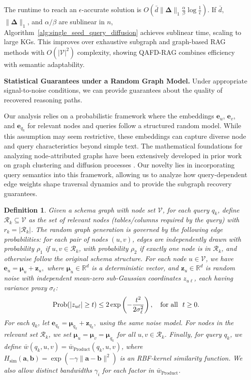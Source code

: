 \documentclass{article} %
\newtheorem{definition}[theorem]{Definition}
\begin{document}
The runtime to reach an $\epsilon$-accurate solution is $O(\bar{d}\|\boldsymbol{\Delta}\|_1 \tfrac{\alpha}{\beta} \log \tfrac{1}{\epsilon})$. If $\bar{d}$, $\|\boldsymbol{\Delta}\|_1$, and $\alpha/\beta$ are sublinear in $n$, Algorithm~\ref{alg:single_seed_query_diffusion} achieves sublinear time, scaling to large KGs. This improves over exhaustive subgraph and graph-based RAG methods with $O(|\mathcal{V}|^2)$ complexity, showing QAFD-RAG combines efficiency with semantic adaptability.

\noindent \textbf{Statistical Guarantees under a Random Graph Model.} Under appropriate signal-to-noise conditions, we can provide guarantees about the quality of recovered reasoning paths.
%


Our analysis relies on a probabilistic framework where the embeddings $\mathbf{e}_u$, $\mathbf{e}_v$, and $\mathbf{e}_{q_{k}}$ for relevant nodes and queries follow a structured random model. While this assumption may seem restrictive, these embeddings can capture diverse node and query characteristics beyond simple text. The mathematical foundations for analyzing node-attributed graphs have been extensively developed in prior work on graph clustering \citep{AP09,ALM13,AGPT2016,PKDJ17,WFHM2017,FWY20,LG20} and diffusion processes \citep{fountoulakis2020p,yang2023weighted,fountoulakis2021local}. Our novelty lies in incorporating query semantics into this framework, allowing us to analyze how query-dependent edge weights shape traversal dynamics and to provide the subgraph recovery guarantees.
%
\begin{definition}
\label{def:correct-model}
    Given a schema graph with node set $\mathcal{V}$, for each query $q_k$, define $\mathcal{R}_k \subseteq \mathcal{V}$ as the set of relevant nodes (tables/columns required by the query) with $r_k=|\mathcal{R}_k|$. The random graph generation is governed by the following edge probabilities: for each pair of nodes $(u,v)$, edges are independently drawn with probability $\rho_1$ if $u,v \in \mathcal{R}_k$, with probability $\rho_2$ if exactly one node is in $\mathcal{R}_k$, and otherwise follow the original schema structure. For each node $u \in \mathcal{V}$, we have
$
\mathbf{e}_u = \boldsymbol{\mu}_u + \mathbf{z}_u,
$
where $\boldsymbol{\mu}_u \in \mathbb{R}^d$ is a deterministic vector, and $\mathbf{z}_u \in \mathbb{R}^d$ is random noise with independent mean-zero sub-Gaussian coordinates $z_{u\ell}$, each having variance proxy $\sigma_\ell$:
$$
\textnormal{Prob}(|z_{u\ell}| \geq t) \leq 2\exp\left(-\frac{t^2}{2\sigma_\ell^2}\right),   \quad \textnormal{for all}~~t \geq 0.
$$
For each $q_k$, let
$
\mathbf{e}_{q_k} = \boldsymbol{\mu}_{q_k} + \mathbf{z}_{q_k},
$
using the same noise model. For nodes in the relevant set $\mathcal{R}_k$, we set $\boldsymbol{\mu}_u = \boldsymbol{\mu}_v = \boldsymbol{\mu}_{q_k}$ for all $u, v \in \mathcal{R}_k$. Finally, for query $q_k$, we define $\bar{w}(q_k, u, v) = \bar{w}_{\text{Product}}(q_k, u, v)$, where $H_{\text{sim}}(\mathbf{a}, \mathbf{b}) = \exp(-\gamma \|\mathbf{a} - \mathbf{b}\|^2)$ is an RBF-kernel similarity function. We also allow distinct bandwidths $\gamma_i$ for each factor in $\bar{w}_{\text{Product}}$.
\end{definition}
\end{document}
